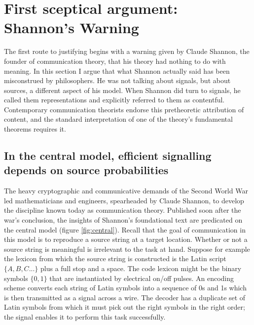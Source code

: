 \documentclass[12pt]{article}
\begin{document}

\section{First sceptical argument: Shannon's Warning}\label{sec:warning}

The first route to justifying \tic{} begins with a warning given by Claude Shannon, the founder of communication theory, that his theory had nothing to do with meaning.
In this section I argue that what Shannon actually said has been misconstrued by philosophers.
He was not talking about signals, but about sources, a different aspect of his model.
When Shannon did turn to signals, he called them representations and explicitly referred to them as contentful.
Contemporary communication theorists endorse this pretheoretic attribution of content, and the standard interpretation of one of the theory's fundamental theorems requires it.



\subsection{In the central model, efficient signalling depends on source probabilities}
The heavy cryptographic and communicative demands of the Second World War led mathematicians and engineers, spearheaded by Claude Shannon, to develop the discipline known today as communication theory.
Published soon after the war's conclusion, the insights of Shannon's foundational text \parencite*{shannon1948mathematicalc} are predicated on the central model (figure \ref{fig:central}).
Recall that the goal of communication in this model is to reproduce a source string at a target location.
Whether or not a source string is meaningful is irrelevant to the task at hand.
Suppose for example the lexicon from which the source string is constructed is the Latin script $\{A,B,C...\}$ plus a full stop and a space.
The code lexicon might be the binary symbols $\{0,1\}$ that are instantiated by electrical on/off pulses.
An encoding scheme converts each string of Latin symbols into a sequence of 0s and 1s which is then transmitted as a signal across a wire.
The decoder has a duplicate set of Latin symbols from which it must pick out the right symbols in the right order; the signal enables it to perform this task successfully.
\end{document}
